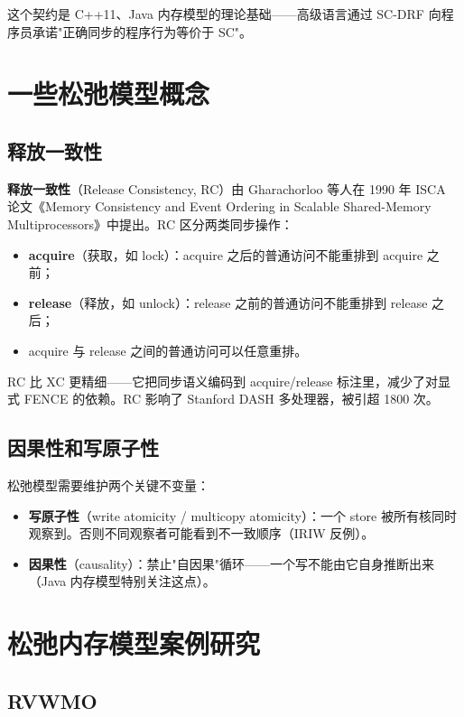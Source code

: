 这个契约是 C++11、Java 内存模型的理论基础——高级语言通过 SC-DRF 向程序员承诺"正确同步的程序行为等价于 SC"。

\section{一些松弛模型概念}

\subsection{释放一致性}

\textbf{释放一致性}（Release Consistency, RC）由 Gharachorloo 等人在 1990 年 ISCA 论文《Memory Consistency and Event Ordering in Scalable Shared-Memory Multiprocessors》中提出。RC 区分两类同步操作：

\begin{itemize}
\item \textbf{acquire}（获取，如 lock）：acquire 之后的普通访问不能重排到 acquire 之前；
\item \textbf{release}（释放，如 unlock）：release 之前的普通访问不能重排到 release 之后；
\item acquire 与 release 之间的普通访问可以任意重排。
\end{itemize}


RC 比 XC 更精细——它把同步语义编码到 acquire/release 标注里，减少了对显式 FENCE 的依赖。RC 影响了 Stanford DASH 多处理器，被引超 1800 次。

\subsection{因果性和写原子性}

松弛模型需要维护两个关键不变量：

\begin{itemize}
\item \textbf{写原子性}（write atomicity / multicopy atomicity）：一个 store 被所有核同时观察到。否则不同观察者可能看到不一致顺序（IRIW 反例）。
\item \textbf{因果性}（causality）：禁止"自因果"循环——一个写不能由它自身推断出来（Java 内存模型特别关注这点）。
\end{itemize}


\section{松弛内存模型案例研究}

\subsection{RVWMO}

